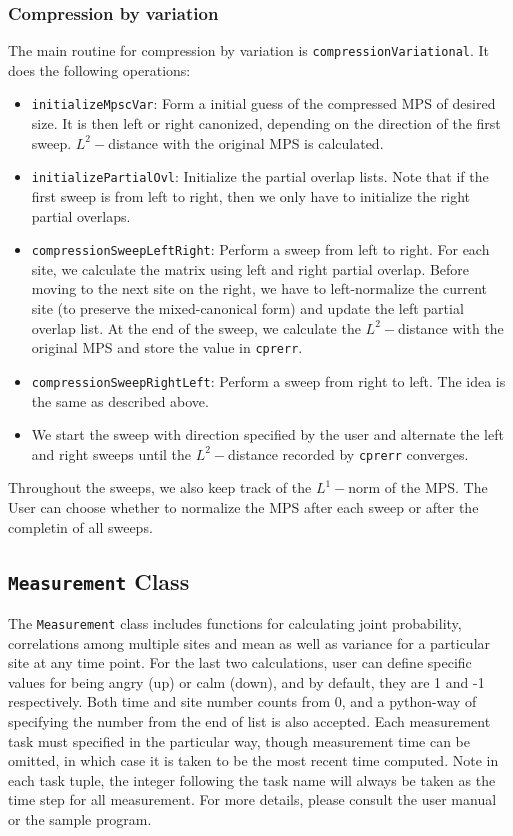 \documentclass[english]{article}
\begin{document}
\subsubsection{Compression by variation}
The main routine for compression by variation is \texttt{compressionVariational}. It does the following operations:
\begin{itemize}
\item \texttt{initializeMpscVar}: Form a initial guess of the compressed MPS of desired size. It is then left or right canonized, depending on the direction of the first sweep. $L^2-$distance with the original MPS is calculated. 
\item \texttt{initializePartialOvl}: Initialize the partial overlap lists. Note that if the first sweep is from left to right, then we only have to initialize the right partial overlaps.
\item \texttt{compressionSweepLeftRight}: Perform a sweep from left to right. For each site, we calculate the matrix using left and right partial overlap. Before moving to the next site on the right, we have to left-normalize the current site (to preserve the mixed-canonical form) and update the left partial overlap list. At the end of the sweep, we calculate the $L^2-$distance with the original MPS and store the value in \texttt{cpr\textunderscore err}.
\item \texttt{compressionSweepRightLeft}: Perform a sweep from right to left. The idea is the same as described above.
\item We start the sweep with direction specified by the user and alternate the left and right sweeps until the $L^2-$distance recorded by \texttt{cpr\textunderscore err} converges.
\end{itemize}
Throughout the sweeps, we also keep track of the $L^1-$norm of the MPS. The User can choose whether to normalize the MPS after each sweep or after the completin of all sweeps.




\subsection{\texttt{Measurement} Class}
The \texttt{Measurement} class includes functions for calculating joint probability, correlations among multiple sites and mean as well as variance for a particular site at any time point. For the last two calculations, user can define specific values for being angry (up) or calm (down), and by default, they are 1 and -1 respectively. Both time and site number counts from 0, and a python-way of specifying the number from the end of list is also accepted. Each measurement task must specified in the particular way, though measurement time can be omitted, in which case it is taken to be the most recent time computed. Note in each task tuple, the integer following the task name will always be taken as the time step for all measurement. For more details, please consult the user manual or the sample program.
\end{document}
